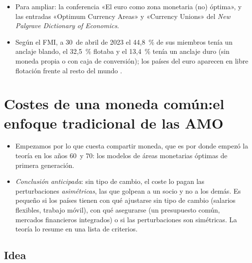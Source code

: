 \documentclass[11pt]{article}
\begin{document}
\begin{anotaciones}
\begin{itemize}
\item Para ampliar: la conferencia «El euro como zona monetaria (no) óptima»\nocite{Vara2019Euro}, y las entradas «Optimum Currency Areas» y «Currency Unions» del \emph{New Palgrave Dictionary of Economics}\nocite{Palgrave2018OCA,Palgrave2018CurrencyUnions}.
\item Según el FMI, a 30~de abril de 2023 el 44,8~\% de sus miembros tenía un anclaje blando, el 32,5~\% flotaba y el 13,4~\% tenía un anclaje duro (sin moneda propia o con caja de conversión); los países del euro aparecen en libre flotación frente al resto del mundo\nocite{FMI2024AREAER2023} .
\end{itemize}
\end{anotaciones}


\section{Costes de una moneda común:\cortetitulo el enfoque tradicional de las AMO}\label{sec:costes}

\begin{itemize}
\item Empezamos por lo que cuesta compartir moneda, que es por donde empezó la teoría en los años 60~y 70: los modelos de áreas monetarias óptimas de primera generación.
\item \emph{Conclusión anticipada}: sin tipo de cambio, el coste lo pagan las perturbaciones \emph{asimétricas}, las que golpean a un socio y no a los demás. Es pequeño si los países tienen con qué ajustarse sin tipo de cambio (salarios flexibles, trabajo móvil), con qué asegurarse (un presupuesto común, mercados financieros integrados) o si las perturbaciones son simétricas. La teoría lo resume en una lista de criterios.
\end{itemize}

\subsection{Idea}\label{sec:idea-amo}
\end{document}
